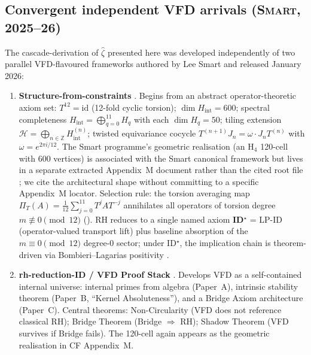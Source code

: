 \documentclass[11pt, a4paper]{amsart}
\theoremstyle{definition}
\begin{document}
\subsection{Convergent independent VFD arrivals
(\textsc{Smart}, 2025--26)}\label{subsec:convergence}

The cascade-derivation of $\widehat\zeta$ presented here was
developed independently of two parallel VFD-flavoured frameworks
authored by Lee Smart and released January 2026:

\begin{enumerate}
\item \textbf{Structure-from-constraints} \cite{SmartCanonicalFramework, SmartPaperII}.
Begins from an abstract operator-theoretic axiom set:
$T^{12} = \mathrm{id}$ (12-fold cyclic torsion);
$\dim H_{\mathrm{int}} = 600$; spectral completeness
$H_{\mathrm{int}} = \bigoplus_{q=0}^{11} H_q$ with each
$\dim H_q = 50$; tiling extension
$\mathcal{H} = \bigoplus_{n \in \mathbb{Z}} H_{\mathrm{int}}^{(n)}$;
twisted equivariance cocycle
$T^{(n+1)} J_n = \omega \cdot J_n T^{(n)}$ with
$\omega = e^{2\pi i / 12}$.  The Smart programme's geometric
realisation (an H$_4$ 120-cell with 600 vertices) is associated
with the Smart canonical framework but lives in a separate
extracted Appendix~M document rather than the cited root file
\cite{SmartCanonicalFramework}; we cite the architectural shape
without committing to a specific Appendix~M locator.
Selection rule: the torsion averaging map
$\Pi_T(A) = \frac{1}{12}\sum_{j=0}^{11} T^j A T^{-j}$ annihilates
all operators of torsion degree $m \not\equiv 0 \pmod{12}$
(\cite[Theorem 6.3]{SmartCanonicalFramework}). RH reduces to a
single named axiom \textbf{ID$^\star$} = LP-ID (operator-valued
transport lift) plus baseline absorption of the $m \equiv 0
\pmod{12}$ degree-$0$ sector; under ID$^\star$, the implication
chain is theorem-driven via Bombieri--Lagarias positivity
\cite[Thm 5.1]{SmartPaperII}.

\item \textbf{rh-reduction-ID / VFD Proof Stack} \cite{SmartPaperC}.
Develops VFD as a self-contained internal universe: internal
primes from algebra (Paper~A), intrinsic stability theorem
(Paper~B, ``Kernel Absoluteness''), and a Bridge Axiom architecture
(Paper~C). Central theorems: Non-Circularity (VFD does not reference
classical RH); Bridge Theorem (Bridge $\Rightarrow$ RH); Shadow
Theorem (VFD survives if Bridge fails). The 120-cell again appears
as the geometric realisation in CF Appendix~M.
\end{enumerate}
\end{document}
